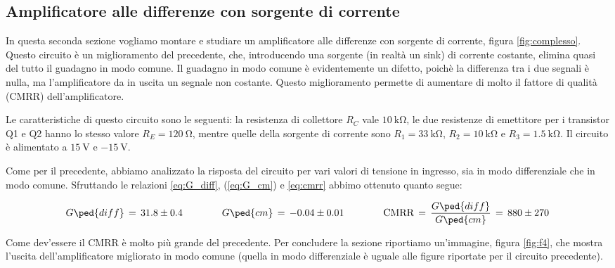 \subsection*{Amplificatore alle differenze con sorgente di corrente}

In questa seconda sezione vogliamo montare e studiare un amplificatore alle differenze con sorgente di corrente, figura \ref{fig:complesso}.
Questo circuito è un miglioramento del precedente, che, introducendo una sorgente (in realtà un sink) di corrente costante, elimina quasi del tutto
il guadagno in modo comune. Il guadagno in modo comune è evidentemente un difetto, poichè la differenza tra i due segnali è nulla, ma l'amplificatore
da in uscita un segnale non costante. Questo miglioramento permette di aumentare di molto il fattore di qualità (CMRR) dell'amplificatore.

Le caratteristiche di questo circuito sono le seguenti: la resistenza di collettore $R_C$ vale $\SI{10}{\kilo\ohm}$, le due resistenze di emettitore per i transistor Q1 e Q2 hanno lo stesso valore $R_E = \SI{120}{\ohm}$, mentre quelle della sorgente di corrente sono $R_1 = \SI{33}{\kilo\ohm}$, $R_2 = \SI{10}{\kilo\ohm}$ e $R_3 = \SI{1.5}{\kilo\ohm}$.
Il circuito è alimentato a $\SI{+15}{\volt}$ e $\SI{-15}{\volt}$.

Come per il precedente, abbiamo analizzato la risposta del circuito per vari valori di tensione in ingresso, sia in modo differenziale che in modo comune.
Sfruttando le relazioni \eqref{eq:G_diff}, (\ref{eq:G_cm}) e \eqref{eq:cmrr} abbimo ottenuto quanto segue:

\begin{equation}
    G\ped{diff}\,=\, 31.8 \pm 0.4  \qquad\qquad G\ped{cm}\,=\, -0.04 \pm 0.01 \qquad\qquad \text{CMRR}\,=\,\frac{G\ped{diff}}{G\ped{cm}}\,=\, 880 \pm 270
\end{equation}

Come dev'essere il CMRR è molto più grande del precedente.
Per concludere la sezione riportiamo un'immagine, figura \ref{fig:f4}, che mostra l'uscita dell'amplificatore migliorato in modo comune (quella in modo differenziale è uguale
alle figure riportate per il circuito precedente).
